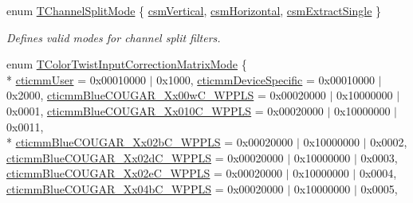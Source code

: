 \begin{DoxyCompactItemize}
enum \hyperlink{group___common_interface_gae8e9f7bb0e510d844b2681642e8e46d2}{T\+Channel\+Split\+Mode} \{ \hyperlink{group___common_interface_ggae8e9f7bb0e510d844b2681642e8e46d2a2a420e411cb45310319bef8b1c59083b}{csm\+Vertical}, 
\hyperlink{group___common_interface_ggae8e9f7bb0e510d844b2681642e8e46d2ab0187cc76bba95e6901e536a740490e0}{csm\+Horizontal}, 
\hyperlink{group___common_interface_ggae8e9f7bb0e510d844b2681642e8e46d2a5fcafc03761898f506f014ed8da9b626}{csm\+Extract\+Single}
 \}
\begin{DoxyCompactList}\small\item\em Defines valid modes for channel split filters. \end{DoxyCompactList}\item 
enum \hyperlink{group___common_interface_ga514bdc683ef27995fdeba04aec25f571}{T\+Color\+Twist\+Input\+Correction\+Matrix\+Mode} \{ \\*
\hyperlink{group___common_interface_gga514bdc683ef27995fdeba04aec25f571a130b00fad51a7e5748f2549236d23a8b}{cticmm\+User} = 0x00010000 $\vert$ 0x1000, 
\hyperlink{group___common_interface_gga514bdc683ef27995fdeba04aec25f571a7f5ba29b2837eecfa3b513e3c8bd6a7c}{cticmm\+Device\+Specific} = 0x00010000 $\vert$ 0x2000, 
\hyperlink{group___common_interface_gga514bdc683ef27995fdeba04aec25f571a0b9318f2bf1f3609c7e8de608587d955}{cticmm\+Blue\+C\+O\+U\+G\+A\+R\+\_\+\+Xx00w\+C\+\_\+\+W\+P\+P\+L\+S} = 0x00020000 $\vert$ 0x10000000 $\vert$ 0x0001, 
\hyperlink{group___common_interface_gga514bdc683ef27995fdeba04aec25f571aaea8df529fb301370d0667546f980c34}{cticmm\+Blue\+C\+O\+U\+G\+A\+R\+\_\+\+Xx010\+C\+\_\+\+W\+P\+P\+L\+S} = 0x00020000 $\vert$ 0x10000000 $\vert$ 0x0011, 
\\*
\hyperlink{group___common_interface_gga514bdc683ef27995fdeba04aec25f571a71e8882b3d5401431a20ae8e4a77c221}{cticmm\+Blue\+C\+O\+U\+G\+A\+R\+\_\+\+Xx02b\+C\+\_\+\+W\+P\+P\+L\+S} = 0x00020000 $\vert$ 0x10000000 $\vert$ 0x0002, 
\hyperlink{group___common_interface_gga514bdc683ef27995fdeba04aec25f571ac3964226e81840596144fbf4a1bb2711}{cticmm\+Blue\+C\+O\+U\+G\+A\+R\+\_\+\+Xx02d\+C\+\_\+\+W\+P\+P\+L\+S} = 0x00020000 $\vert$ 0x10000000 $\vert$ 0x0003, 
\hyperlink{group___common_interface_gga514bdc683ef27995fdeba04aec25f571a265a111cd74d127a6ff023b490bec60c}{cticmm\+Blue\+C\+O\+U\+G\+A\+R\+\_\+\+Xx02e\+C\+\_\+\+W\+P\+P\+L\+S} = 0x00020000 $\vert$ 0x10000000 $\vert$ 0x0004, 
\hyperlink{group___common_interface_gga514bdc683ef27995fdeba04aec25f571a2f8c559e4d446beac35dc7348810f486}{cticmm\+Blue\+C\+O\+U\+G\+A\+R\+\_\+\+Xx04b\+C\+\_\+\+W\+P\+P\+L\+S} = 0x00020000 $\vert$ 0x10000000 $\vert$ 0x0005, 

\end{DoxyCompactItemize}
